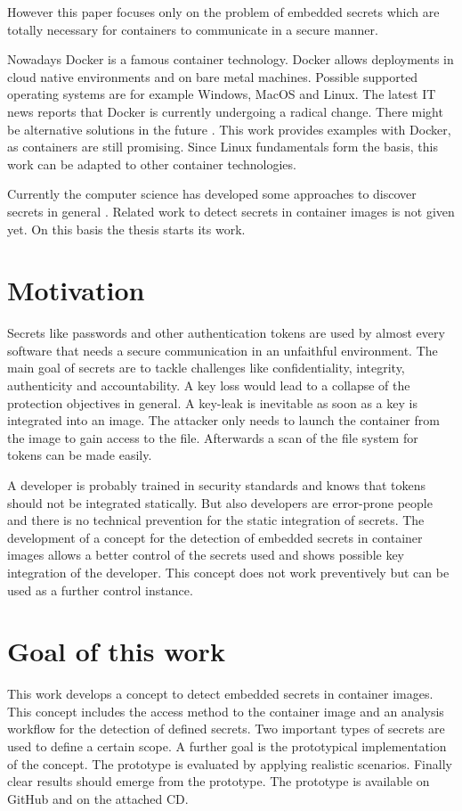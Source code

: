 However this paper focuses only on the problem of embedded secrets which are totally necessary for containers to communicate in a secure manner.

Nowadays Docker is a famous container technology. Docker allows deployments in cloud native environments and on bare metal machines. Possible supported operating systems are for example Windows, MacOS and Linux.
The latest IT news reports that Docker is currently undergoing a radical change. There might be alternative solutions in the future \cite{docker_heise}. This work provides examples with Docker, as containers are still promising. Since Linux fundamentals form the basis, this work can be adapted to other container technologies.

Currently the computer science has developed some approaches to discover secrets in general \cite{7180102}. Related work to detect secrets in container images is not given yet.
On this basis the thesis starts its work.

%
%
\section{Motivation}
\label{sec:intro:motivation}
Secrets like passwords and other authentication tokens are used by almost every software that needs a secure communication in an unfaithful environment. The main goal of secrets are to tackle challenges like confidentiality, integrity, authenticity and accountability. A key loss would lead to a collapse of the  protection objectives in general. A key-leak is inevitable as soon as a key is integrated into an image.
The attacker only needs to launch the container from the image to gain access to the file. Afterwards a scan of the file system for tokens can be made easily. 

A developer is probably trained in security standards and knows that tokens should not be integrated statically. But also developers are error-prone people and there is no technical prevention for the static integration of secrets. 
The development of a concept for the detection of embedded secrets in container images allows a better control of the secrets used and shows possible key integration of the developer. This concept does not work preventively but can be used as a further control instance.%
%
\section{Goal of this work}
\label{sec:intro:goal}
This work develops a concept to detect embedded secrets in container images. This concept includes the access method to the container image and an analysis workflow for the detection of defined secrets. Two important types of secrets are used to define a certain scope. A further goal is the prototypical implementation of the concept. The prototype is evaluated by applying realistic scenarios.
Finally clear results should emerge from the prototype. The prototype is available on GitHub and on the attached CD.

